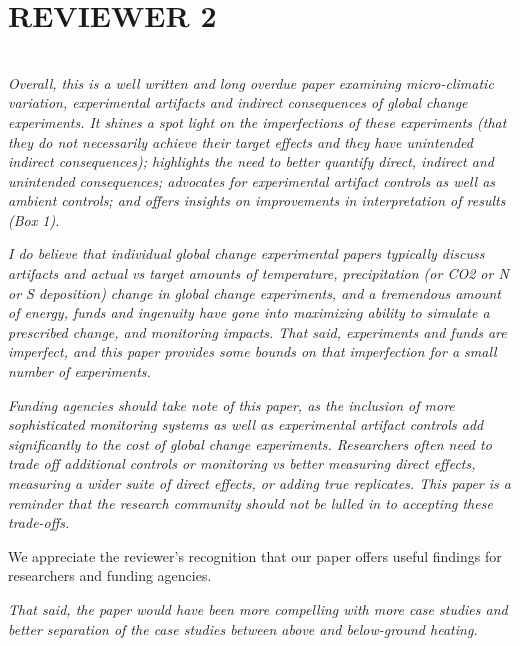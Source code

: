 \documentclass[11pt,a4paper]{letter}
\begin{document}
\begin{letter}{}
\section {REVIEWER 2}\\
\emph{Overall, this is a well written and long overdue paper examining micro-climatic variation, experimental artifacts and indirect consequences of global change experiments.  It shines a spot light on the imperfections of these experiments (that they do not necessarily achieve their target effects and they have unintended indirect consequences); highlights the need to better quantify direct, indirect and unintended consequences; advocates for experimental artifact controls as well as ambient controls;  and offers insights on improvements in interpretation of results (Box 1).}

\par \emph{I do believe that individual global change experimental papers typically discuss artifacts and actual vs target amounts of temperature, precipitation (or CO2 or N or S deposition) change in global change experiments, and a  tremendous amount of energy, funds and ingenuity have gone into maximizing ability to simulate a prescribed change, and monitoring impacts.  That said, experiments and funds are imperfect, and this paper provides some bounds on that imperfection for a small number of experiments.}

\par \emph{Funding agencies should take note of this paper, as the inclusion of more sophisticated monitoring systems as well as experimental artifact controls add significantly to the cost of global change experiments.  Researchers often need to trade off additional controls or monitoring vs better measuring direct effects, measuring a wider suite of direct effects, or adding true replicates.  This paper is a reminder that the research community should not be lulled in to accepting these trade-offs.}

\par We appreciate the reviewer's recognition that our paper offers useful findings for researchers and funding agencies. 

\par \emph{That said, the paper would have been more compelling with more case studies and better separation of the case studies between above and below-ground heating.}


\end{letter}
\end{document}

